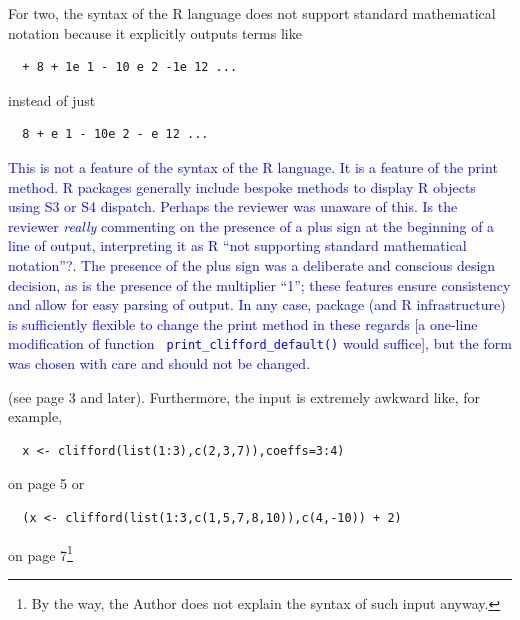 \documentclass{article}
\begin{document}
\begin{itemize}
For two, the syntax of the R language does not support standard
mathematical notation because it explicitly outputs terms like

\begin{verbatim}
  + 8 + 1e 1 - 10 e 2 -1e 12 ...
\end{verbatim}

instead of just

\begin{verbatim}
  8 + e 1 - 10e 2 - e 12 ...
\end{verbatim}

\textcolor{blue}{This is not a feature of the syntax of the R
  language.  It is a feature of the print method.  R packages
  generally include bespoke methods to display R objects using S3 or
  S4 dispatch.  Perhaps the reviewer was unaware of this.  Is the
  reviewer {\em really} commenting on the presence of a plus sign at
  the beginning of a line of output, interpreting it as R ``not
  supporting standard mathematical notation''?.  The presence of the
  plus sign was a deliberate and conscious design decision, as is the
  presence of the multiplier ``1''; these features ensure consistency
  and allow for easy parsing of output.  In any case, package (and R
  infrastructure) is sufficiently flexible to change the print method
  in these regards [a one-line modification of function {\tt
      print\_clifford\_default()} would suffice], but the form was
  chosen with care and should not be changed.}

(see page 3 and later). Furthermore, the input is extremely awkward
like, for example,

\begin{verbatim}
  x <- clifford(list(1:3),c(2,3,7)),coeffs=3:4)
\end{verbatim}

on page 5 or

\begin{verbatim}
  (x <- clifford(list(1:3,c(1,5,7,8,10)),c(4,-10)) + 2)
\end{verbatim}

 on
page 7\footnote{By the way, the Author does not explain the syntax of
such input anyway.}


\end{itemize}
\end{document}
